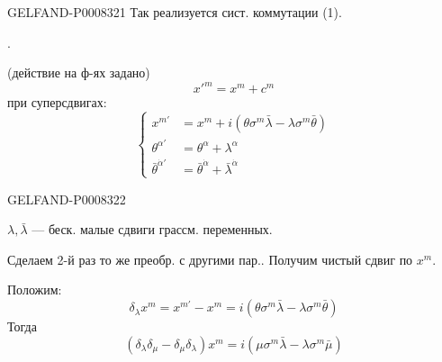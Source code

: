 \begin{GelfandAdjacentEvidence}{GELFAND-P000832}{1}
Так реализуется сист. коммутации (1).

.

(действие на ф-ях задано)
\[
{x'}^m=x^m+c^m
\]
при суперсдвигах:
\begin{equation*}
\left\{\begin{aligned}
x^{m'}&=x^m+i(\theta\sigma^m\bar\lambda-\lambda\sigma^m\bar\theta)\\
\theta^{\alpha'}&=\theta^\alpha+\lambda^\alpha\\
\bar\theta^{\dot\alpha'}&=\bar\theta^{\dot\alpha}+\bar\lambda^{\dot\alpha}
\end{aligned}\right.
\tag{6}
\end{equation*}
\end{GelfandAdjacentEvidence}
\begin{GelfandAdjacentEvidence}{GELFAND-P000832}{2}

\(\lambda,\bar\lambda\) — беск. малые сдвиги грассм. переменных.

Сделаем 2-й раз то же преобр. с другими пар.. Получим чистый сдвиг по \(x^m\).

Положим:
\[
\delta_\lambda x^m=x^{m'}-x^m
=i(\theta\sigma^m\bar\lambda-\lambda\sigma^m\bar\theta)
\]
Тогда
\begin{equation*}
(\delta_\lambda\delta_\mu-\delta_\mu\delta_\lambda)x^m
=i(\mu\sigma^m\bar\lambda-\lambda\sigma^m\bar\mu)
\tag{7}
\end{equation*}
\end{GelfandAdjacentEvidence}
